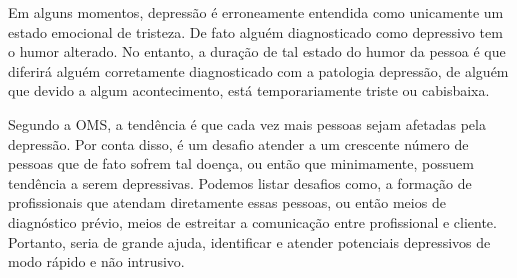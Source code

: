 Em alguns momentos, depressão é erroneamente entendida como unicamente um estado emocional de tristeza. De fato alguém diagnosticado como depressivo tem o humor alterado. No entanto, a duração de tal estado do humor da pessoa é que diferirá alguém corretamente diagnosticado com a patologia depressão, de alguém que devido a algum acontecimento, está temporariamente triste ou cabisbaixa.



Segundo a OMS, a tendência é que cada vez mais pessoas sejam afetadas pela depressão. Por conta disso, é um desafio atender a um crescente número de pessoas que de fato sofrem tal doença, ou então que minimamente, possuem tendência a serem depressivas. Podemos listar desafios como, a formação de profissionais que atendam diretamente essas pessoas, ou então meios de diagnóstico prévio, meios de estreitar a comunicação entre profissional e cliente. Portanto, seria de grande ajuda, identificar e atender potenciais depressivos de modo rápido e não intrusivo.


